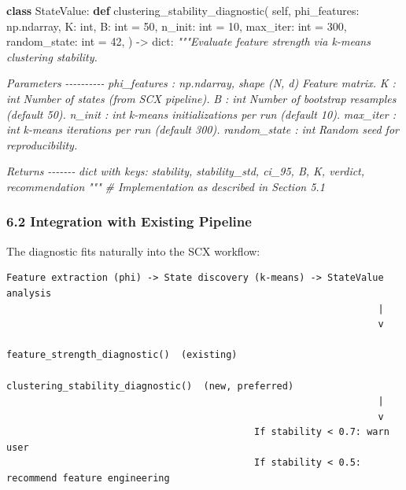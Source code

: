 \documentclass[
  12pt,
]{article}
\newenvironment{Shaded}{}{}
\newcommand{\BuiltInTok}[1]{\textcolor[rgb]{0.00,0.50,0.00}{#1}}
\newcommand{\CommentTok}[1]{\textcolor[rgb]{0.38,0.63,0.69}{\textit{#1}}}
\newcommand{\DecValTok}[1]{\textcolor[rgb]{0.25,0.63,0.44}{#1}}
\newcommand{\KeywordTok}[1]{\textcolor[rgb]{0.00,0.44,0.13}{\textbf{#1}}}
\newcommand{\NormalTok}[1]{#1}
\newcommand{\OperatorTok}[1]{\textcolor[rgb]{0.40,0.40,0.40}{#1}}
\newcommand{\VariableTok}[1]{\textcolor[rgb]{0.10,0.09,0.49}{#1}}
\begin{document}
\begin{Shaded}
\begin{Highlighting}[]
\KeywordTok{class}\NormalTok{ StateValue:}
    \KeywordTok{def}\NormalTok{ clustering\_stability\_diagnostic(}
        \VariableTok{self}\NormalTok{,}
\NormalTok{        phi\_features: np.ndarray,}
\NormalTok{        K: }\BuiltInTok{int}\NormalTok{,}
\NormalTok{        B: }\BuiltInTok{int} \OperatorTok{=} \DecValTok{50}\NormalTok{,}
\NormalTok{        n\_init: }\BuiltInTok{int} \OperatorTok{=} \DecValTok{10}\NormalTok{,}
\NormalTok{        max\_iter: }\BuiltInTok{int} \OperatorTok{=} \DecValTok{300}\NormalTok{,}
\NormalTok{        random\_state: }\BuiltInTok{int} \OperatorTok{=} \DecValTok{42}\NormalTok{,}
\NormalTok{    ) }\OperatorTok{{-}\textgreater{}} \BuiltInTok{dict}\NormalTok{:}
        \CommentTok{"""Evaluate feature strength via k{-}means clustering stability.}

\CommentTok{        Parameters}
\CommentTok{        {-}{-}{-}{-}{-}{-}{-}{-}{-}{-}}
\CommentTok{        phi\_features : np.ndarray, shape (N, d)}
\CommentTok{            Feature matrix.}
\CommentTok{        K : int}
\CommentTok{            Number of states (from SCX pipeline).}
\CommentTok{        B : int}
\CommentTok{            Number of bootstrap resamples (default 50).}
\CommentTok{        n\_init : int}
\CommentTok{            k{-}means initializations per run (default 10).}
\CommentTok{        max\_iter : int}
\CommentTok{            k{-}means iterations per run (default 300).}
\CommentTok{        random\_state : int}
\CommentTok{            Random seed for reproducibility.}

\CommentTok{        Returns}
\CommentTok{        {-}{-}{-}{-}{-}{-}{-}}
\CommentTok{        dict with keys:}
\CommentTok{            stability, stability\_std, ci\_95, B, K, verdict, recommendation}
\CommentTok{        """}
        \CommentTok{\# Implementation as described in Section 5.1}
\end{Highlighting}
\end{Shaded}

\subsubsection{6.2 Integration with Existing
Pipeline}\label{integration-with-existing-pipeline}

The diagnostic fits naturally into the SCX workflow:

\begin{verbatim}
Feature extraction (phi) -> State discovery (k-means) -> StateValue analysis
                                                                  |
                                                                  v
                                            feature_strength_diagnostic()  (existing)
                                            clustering_stability_diagnostic()  (new, preferred)
                                                                  |
                                                                  v
                                            If stability < 0.7: warn user
                                            If stability < 0.5: recommend feature engineering
\end{verbatim}
\end{document}
